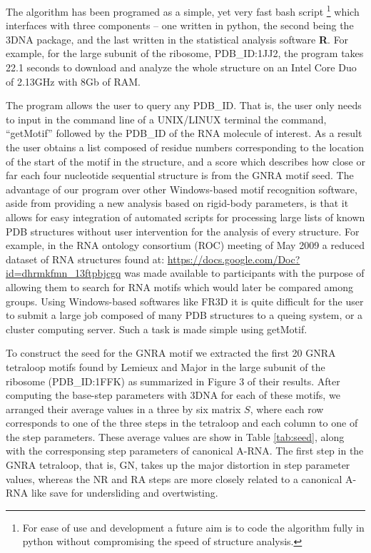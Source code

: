 The  algorithm has  been programed  as a  simple, yet  very  fast bash
script \footnote{For  ease of use and  development a future  aim is to
  code the algorithm fully in python without compromising the speed of
  structure analysis.}  which interfaces  with three components -- one
written in  python, the  second being the  3DNA package, and  the last
written in the statistical analysis software \textbf{R}.  For example,
for the large subunit of the ribosome, PDB\_ID:1JJ2, the program takes
22.1 seconds to  download and analyze the whole  structure on an Intel
Core Duo of 2.13GHz with 8Gb of RAM.

The program  allows the user to  query any PDB\_ID. That  is, the user
only needs to  input in the command line of  a UNIX/LINUX terminal the
command, ``getMotif'' followed  by the PDB\_ID of the  RNA molecule of
interest.  As  a result  the user obtains  a list composed  of residue
numbers corresponding to the location of the start of the motif in the
structure,  and a score  which describes  how close  or far  each four
nucleotide  sequential structure  is from  the GNRA  motif  seed.  The
advantage of  our program  over other Windows-based  motif recognition
software,  aside from  providing a  new analysis  based  on rigid-body
parameters,  is  that it  allows  for  easy  integration of  automated
scripts  for processing large  lists of  known PDB  structures without
user intervention for the analysis of every structure. For example, in
the  RNA ontology  consortium  (ROC)  meeting of  May  2009 a  reduced
dataset        of        RNA        structures        found        at:
\url{https://docs.google.com/Doc?id=dhrmkfmn_13ftpbjcgq}    was   made
available to participants with the  purpose of allowing them to search
for  RNA motifs  which would  later be  compared among  groups.  Using
Windows-based  softwares  like  FR3D  \cite{sarver2008}  it  is  quite
difficult for  the user  to submit  a large job  composed of  many PDB
structures to a  queing system, or a cluster  computing server. Such a
task is made simple using getMotif.

To construct  the seed for  the GNRA motif  we extracted the  first 20
GNRA tetraloop motifs found by Lemieux and Major \cite{lemieux2006} in
the  large subunit  of the  ribosome (PDB\_ID:1FFK)  as  summarized in
Figure 3  of their results.  After computing  the base-step parameters
with 3DNA for  each of these motifs, we  arranged their average values
in a three by six matrix $S$, where each row corresponds to one of the
three  steps in  the tetraloop  and  each column  to one  of the  step
parameters.  These  average values  are show in  Table \ref{tab:seed},
along with  the corresponsing step parameters of  canonical A-RNA. The
first step  in the  GNRA tetraloop,  that is, GN,  takes up  the major
distortion in step  parameter values, whereas the NR  and RA steps are
more closely related  to a canonical A-RNA like  save for undersliding
and overtwisting.

